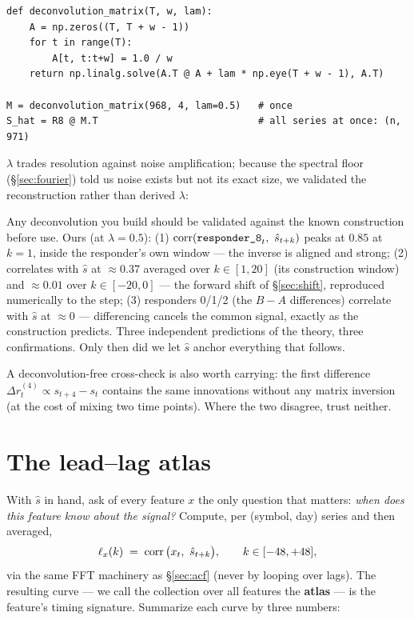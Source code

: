 \begin{lstlisting}
def deconvolution_matrix(T, w, lam):
    A = np.zeros((T, T + w - 1))
    for t in range(T):
        A[t, t:t+w] = 1.0 / w
    return np.linalg.solve(A.T @ A + lam * np.eye(T + w - 1), A.T)

M = deconvolution_matrix(968, 4, lam=0.5)   # once
S_hat = R8 @ M.T                            # all series at once: (n, 971)
\end{lstlisting}

$\lambda$ trades resolution against noise amplification; because the
spectral floor (\S\ref{sec:fourier}) told us noise exists but not its exact
size, we validated the reconstruction rather than derived $\lambda$:

\begin{jsbox}
Any deconvolution you build should be validated against the known
construction before use. Ours (at $\lambda = 0.5$):
(1) $\operatorname{corr}(\texttt{responder\_8}_t,\ \hat s_{t+k})$ peaks at $0.85$ at $k{=}1$, inside
the responder's own window --- the inverse is aligned and strong;
(2)  correlates with $\hat s$ at $\approx 0.37$ averaged over
$k \in [1,20]$ (its construction window) and $\approx 0.01$ over
$k \in [-20, 0]$ --- the forward shift of \S\ref{sec:shift}, reproduced
numerically to the step;
(3) responders 0/1/2 (the $B{-}A$ differences) correlate with $\hat s$ at
$\approx 0$ --- differencing cancels the common signal, exactly as the
construction predicts. Three independent predictions of the theory, three
confirmations. Only then did we let $\hat s$ anchor everything that
follows.
\end{jsbox}

A deconvolution-free cross-check is also worth carrying: the first
difference $\Delta r^{(4)}_t \propto s_{t+4} - s_{t}$ contains the same
innovations without any matrix inversion (at the cost of mixing two time
points). Where the two disagree, trust neither.

\section{The lead--lag atlas}
\label{sec:atlas}

With $\hat s$ in hand, ask of every feature $x$ the only question that
matters: \emph{when does this feature know about the signal?} Compute, per
(symbol, day) series and then averaged,
\[
\ell_x(k) \;=\; \operatorname{corr}\big(x_t,\ \hat s_{t+k}\big),
\qquad k \in [-48, +48],
\]
via the same FFT machinery as \S\ref{sec:acf} (never by looping over lags).
The resulting curve --- we call the collection over all features the
\textbf{atlas} --- is the feature's timing signature. Summarize each curve
by three numbers:

